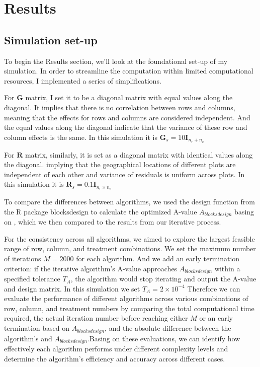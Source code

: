 \documentclass[
  a4paper,
  oneside,
  openany,
  12pt,
  onecolumn]{book}
\theoremstyle{definition}
\theoremstyle{plain}
\theoremstyle{remark}
\begin{document}

\chapter{Results}\label{sec-results}

\section{Simulation set-up}\label{simulation-set-up}

To begin the Results section, we'll look at the foundational set-up of
my simulation. In order to streamline the computation within limited
computational resources, I implemented a series of simplifications.

For \(\boldsymbol{G}\) matrix, I set it to be a diagonal matrix with
equal values along the diagonal. It implies that there is no correlation
between rows and columns, meaning that the effects for rows and columns
are considered independent. And the equal values along the diagonal
indicate that the variance of these row and column effects is the same.
In this simulation it is
\(\boldsymbol{G}_s = 10\boldsymbol{I}_{n_r+n_c}\)

For \(\boldsymbol{R}\) matrix, similarly, it is set as a diagonal matrix
with identical values along the diagonal. implying that the geographical
locations of different plots are independent of each other and variance
of residuals is uniform across plots. In this simulation it is
\(\boldsymbol{R}_s = 0.1\boldsymbol{I}_{n_r\times n_c}\)

To compare the differences between algorithms, we used the design
function from the R package blocksdesign to calculate the optimized
A-value \(A_{blocksdesign}\) basing on \citet{edmondson2020multi}, which
we then compared to the results from our iterative process.

For the consistency across all algorithms, we aimed to explore the
largest feasible range of row, column, and treatment combinations. We
set the maximum number of iterations \(M=2000\) for each algorithm. And
we add an early termination criterion: if the iterative algorithm's
A-value approaches \(A_{blocksdesign}\) within a specified tolerance
\(T_A\), the algorithm would stop iterating and output the A-value and
design matrix. In this simulation we set \(T_A=2\times 10^{-4}\)
Therefore we can evaluate the performance of different algorithms across
various combinations of row, column, and treatment numbers by comparing
the total computational time required, the actual iteration number
before reaching either \(M\) or an early termination based on
\(A_{blocksdesign}\), and the absolute difference between the
algorithm's and \(A_{blocksdesign}\).Basing on these evaluations, we can
identify how effectively each algorithm performs under different
complexity levels and determine the algorithm's efficiency and accuracy
across different cases.
\end{document}
